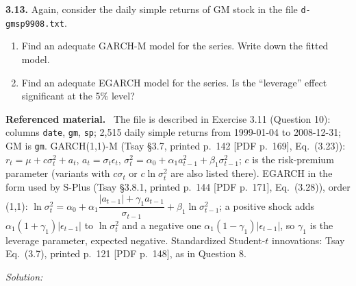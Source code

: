 \documentclass[11pt,a4paper]{article}
\newif\ifsolucoes
\newcommand{\espacoresol}{4.5cm}   %
\newenvironment{refmat}{\par\smallskip\noindent\begin{minipage}{\linewidth}\small\textbf{Referenced material.}~}{\end{minipage}\par\smallskip}
\newcommand{\resolespaco}{\ifsolucoes\else\par\textit{Solution:}\vspace{\espacoresol}\par\fi}
\begin{document}
\noindent\textbf{3.13.} Again, consider the daily simple returns of GM stock in the file \texttt{d-gmsp9908.txt}.
\begin{enumerate}[label=(\alph*)]
\item Find an adequate GARCH-M model for the series. Write down the fitted model.
\item Find an adequate EGARCH model for the series. Is the ``leverage'' effect significant at the 5\% level?
\end{enumerate}
\begin{refmat}
The file is described in Exercise 3.11 (Question 10): columns \texttt{date}, \texttt{gm}, \texttt{sp}; 2,515
daily simple returns from 1999-01-04 to 2008-12-31; GM is \texttt{gm}. GARCH(1,1)-M (Tsay \S3.7, printed p.~142
[PDF p.~169], Eq.~(3.23)): $r_t=\mu+c\sigma_t^2+a_t$, $a_t=\sigma_t\epsilon_t$,
$\sigma_t^2=\alpha_0+\alpha_1a_{t-1}^2+\beta_1\sigma_{t-1}^2$; $c$ is the risk-premium parameter (variants with $c\sigma_t$
or $c\ln\sigma_t^2$ are also listed there). EGARCH in the form used by S-Plus (Tsay \S3.8.1, printed p.~144
[PDF p.~171], Eq.~(3.28)), order (1,1):
$\ln\sigma_t^2=\alpha_0+\alpha_1\dfrac{|a_{t-1}|+\gamma_1a_{t-1}}{\sigma_{t-1}}+\beta_1\ln\sigma_{t-1}^2$; a positive
shock adds $\alpha_1(1+\gamma_1)|\epsilon_{t-1}|$ to $\ln\sigma_t^2$ and a negative one $\alpha_1(1-\gamma_1)|\epsilon_{t-1}|$,
so $\gamma_1$ is the leverage parameter, expected negative. Standardized Student-$t$ innovations: Tsay Eq.~(3.7),
printed p.~121 [PDF p.~148], as in Question 8.
\end{refmat}
\resolespaco
\end{document}
